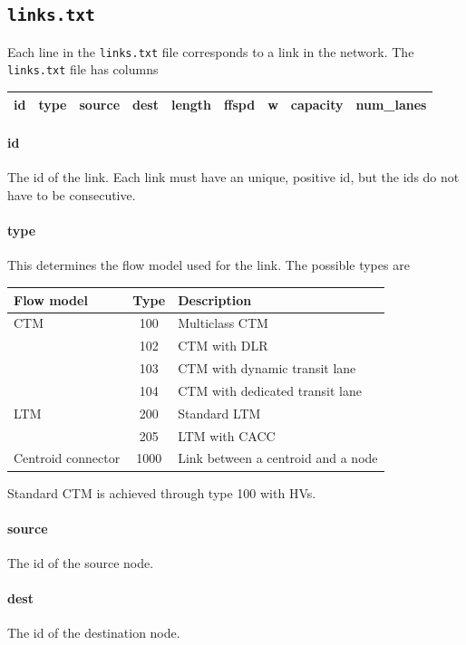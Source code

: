 \subsection{\texttt{links.txt}}

Each line in the \texttt{links.txt} file corresponds to a link in the network. The \texttt{links.txt} file has columns
\begin{center}
\begin{tabular}{ccccccccc}
\hline
id & type & source & dest & length & ffspd & w & capacity & num\_lanes \\\hline
\end{tabular}
\end{center}
\paragraph*{id} The id of the link. Each link must have an unique, positive id, but the ids do not have to be consecutive.
\paragraph*{type} This determines the flow model used for the link. The possible types are
\begin{center}
\begin{tabular}{lcl}
\hline Flow model & Type & Description\\\hline
CTM & 100 & Multiclass CTM~\cite{levin2016multiclass} \\
& 102 & CTM with DLR~\cite{levin2016cell}\\
& 103 & CTM with dynamic transit lane\\
& 104 & CTM with dedicated transit lane\\
\hline
LTM & 200 & Standard LTM~\cite{yperman2005link, yperman2007link}\\
& 205 & LTM with CACC\\\hline
Centroid connector & 1000 & Link between a centroid and a node\\\hline
\end{tabular}
\end{center}
Standard CTM is achieved through type 100 with HVs.
\paragraph*{source} The id of the source node.
\paragraph*{dest} The id of the destination node.
